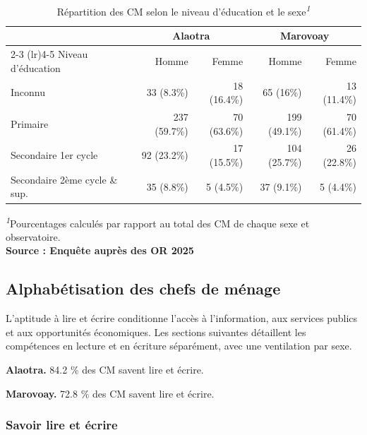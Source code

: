 \documentclass[
  french,
  letterpaper,
]{report}
\begin{document}
\begin{table}
\caption*{
{\fontsize{20}{25}\selectfont  Répartition des CM selon le niveau d'éducation et le sexe\textsuperscript{\textit{1}}\fontsize{12}{15}\selectfont }
} 
\fontsize{12.0pt}{14.0pt}\selectfont
\begin{tabular*}{\linewidth}{@{\extracolsep{\fill}}lrrrr}
\toprule
 & \multicolumn{2}{c}{Alaotra} & \multicolumn{2}{c}{Marovoay} \\ 
\cmidrule(lr){2-3} \cmidrule(lr){4-5}
Niveau d'éducation & Homme & Femme & Homme & Femme \\ 
\midrule\addlinespace[2.5pt]
Inconnu & 33 (8.3\%) & 18 (16.4\%) & 65 (16\%) & 13 (11.4\%) \\ 
Primaire & 237 (59.7\%) & 70 (63.6\%) & 199 (49.1\%) & 70 (61.4\%) \\ 
Secondaire 1er cycle & 92 (23.2\%) & 17 (15.5\%) & 104 (25.7\%) & 26 (22.8\%) \\ 
Secondaire 2ème cycle \& sup. & 35 (8.8\%) & 5 (4.5\%) & 37 (9.1\%) & 5 (4.4\%) \\ 
\bottomrule
\end{tabular*}
\begin{minipage}{\linewidth}
\textsuperscript{\textit{1}}Pourcentages calculés par rapport au total des CM de chaque sexe et observatoire.\\
\textbf{Source : Enquête auprès des OR 2025}\\
\end{minipage}
\end{table}

\subsection{Alphabétisation des chefs de
ménage}\label{alphabuxe9tisation-des-chefs-de-muxe9nage}

L'aptitude à lire et écrire conditionne l'accès à l'information, aux
services publics et aux opportunités économiques. Les sections suivantes
détaillent les compétences en lecture et en écriture séparément, avec
une ventilation par sexe.

\textbf{Alaotra.} 84.2 \% des CM savent lire et écrire.

\textbf{Marovoay.} 72.8 \% des CM savent lire et écrire.

\subsubsection{Savoir lire et écrire}\label{savoir-lire-et-uxe9crire}
\end{document}
